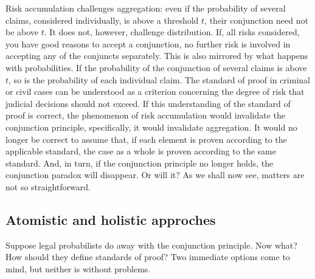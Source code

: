 \documentclass[
  10pt,
  dvipsnames,enabledeprecatedfontcommands]{scrartcl}
\begin{document}
Risk accumulation challenges aggregation: even if the probability of
several claims, considered individually, is above a threshold \(t\),
their conjunction need not be above \(t\). It does not, however,
challenge distribution. If, all risks considered, you have good reasons
to accept a conjunction, no further risk is involved in accepting any of
the conjuncts separately. This is also mirrored by what happens with
probabilities. If the probability of the conjunction of several claims
is above \(t\), so is the probability of each individual claim. The
standard of proof in criminal or civil cases can be understood as a
criterion concerning the degree of risk that judicial decisions should
not exceed. If this understanding of the standard of proof is correct,
the phenomenon of risk accumulation would invalidate the conjunction
principle, specifically, it would invalidate aggregation. It would no
longer be correct to assume that, if each element is proven according to
the applicable standard, the case as a whole is proven according to the
same standard. And, in turn, if the conjunction principle no longer
holds, the conjunction paradox will disappear. Or will it? As we shall
now see, matters are not so straightforward.

\hypertarget{atomistic-and-holistic-approches}{%
\subsection{Atomistic and holistic
approches}\label{atomistic-and-holistic-approches}}

Suppose legal probabilists do away with the conjunction principle. Now
what? How should they define standards of proof? Two immediate options
come to mind, but neither is without problems.
\end{document}
